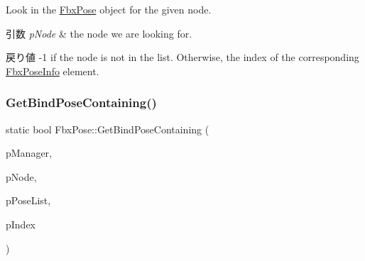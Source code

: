 Look in the \hyperlink{class_fbx_pose}{Fbx\+Pose} object for the given node. 
\begin{DoxyParams}{引数}
{\em p\+Node} & the node we are looking for. \\
\hline
\end{DoxyParams}
\begin{DoxyReturn}{戻り値}
-\/1 if the node is not in the list. Otherwise, the index of the corresponding \hyperlink{struct_fbx_pose_info}{Fbx\+Pose\+Info} element. 
\end{DoxyReturn}
\mbox{\label{class_fbx_pose_a0f3a4900ad6a6ccaae87e419f55abff1}} 
\subsubsection{\texorpdfstring{Get\+Bind\+Pose\+Containing()}{GetBindPoseContaining()}\hspace{0.1cm}{\footnotesize\ttfamily [1/2]}}
{\footnotesize\ttfamily static bool Fbx\+Pose\+::\+Get\+Bind\+Pose\+Containing (\begin{DoxyParamCaption}\item[{\hyperlink{class_fbx_manager}{Fbx\+Manager} \&}]{p\+Manager,  }\item[{\hyperlink{class_fbx_node}{Fbx\+Node} $\ast$}]{p\+Node,  }\item[{\hyperlink{fbxpose_8h_ad68863a9c2ab60c2210bb3dff02a680a}{Pose\+List} \&}]{p\+Pose\+List,  }\item[{\hyperlink{class_fbx_array}{Fbx\+Array}$<$ int $>$ \&}]{p\+Index }\end{DoxyParamCaption})\hspace{0.3cm}{\ttfamily [static]}}

